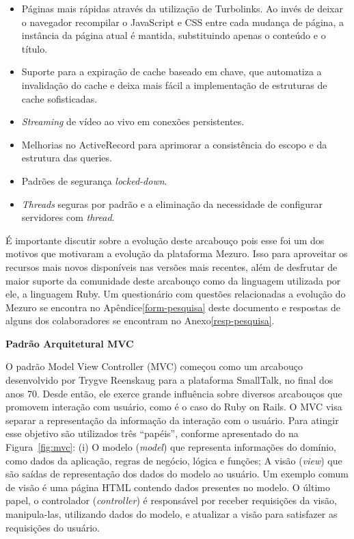 \begin{itemize}

	\item Páginas mais rápidas através da utilização de Turbolinks. Ao invés de deixar o navegador recompilar o JavaScript e CSS entre cada mudança de página, a instância da página atual é mantida, substituindo apenas o conteúdo e o título.

	\item Suporte para a expiração de cache baseado em chave, que automatiza a invalidação do cache e deixa mais fácil a implementação de estruturas de cache sofisticadas.

	\item \textit{Streaming} de vídeo ao vivo em conexões persistentes.

	\item Melhorias no ActiveRecord para aprimorar a consistência do escopo e da estrutura das queries.

	\item Padrões de segurança \textit{locked-down}.

	\item \textit{Threads} seguras por padrão e a eliminação da necessidade de configurar servidores com \textit{thread}.

\end{itemize}


É importante discutir sobre a evolução deste arcabouço pois esse foi um dos motivos que motivaram a evolução da plataforma Mezuro. Isso para aproveitar os recursos mais novos disponíveis nas versões mais recentes, além de desfrutar de maior suporte da comunidade deste arcabouço como da linguagem utilizada por ele, a linguagem Ruby. Um questionário com questões relacionadas a evolução do Mezuro se encontra no Apêndice\ref{form-pesquisa} deste documento e respostas de alguns dos colaboradores  se encontram no Anexo\ref{resp-pesquisa}.


\textbf{Padrão Arquitetural MVC}

O padrão Model View Controller (MVC) começou como um arcabouço desenvolvido por Trygve Reenskaug para a plataforma SmallTalk, no final dos anos 70. Desde então, ele exerce grande influência sobre diversos arcabouços que promovem interação com usuário, como é o caso do Ruby on Rails.
%
O MVC visa separar a representação da informação da interação com o usuário. Para atingir esse objetivo são utilizados três ``papéis'', conforme apresentado do na Figura~\ref{fig:mvc}:
%
(i) O modelo (\textit{model}) que representa informações do domínio, como dados
da aplicação, regras de negócio, lógica e funções;
%
A visão (\textit{view}) que são saídas de representação dos dados do modelo ao
usuário. Um exemplo comum de visão é uma página HTML contendo dados presentes
no modelo.
%
O último papel, o controlador (\textit{controller}) é responsável por receber
requisições da visão, manipula-las, utilizando dados do modelo, e atualizar a
visão para satisfazer as requisições do usuário.

